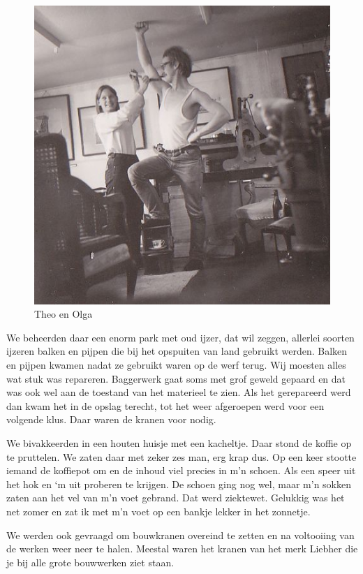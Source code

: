 \documentclass[12pt,twoside, openright]{memoir}
\begin{document}
\begin{figure}
\centering
\includegraphics[width=\textwidth]{img/223TheoenOlga.jpg}
\caption*{\footnotesize Theo en Olga}
\end{figure} 

We beheerden daar een enorm park met oud ijzer, dat wil zeggen, allerlei soorten ijzeren balken en pijpen die bij het opspuiten van land gebruikt werden. Balken en pijpen kwamen nadat ze gebruikt waren op de werf terug. Wij moesten alles wat stuk was repareren. Baggerwerk gaat soms met grof geweld gepaard en dat was ook wel aan de toestand van het materieel te zien. Als het gerepareerd werd dan kwam het in de opslag terecht, tot het weer afgeroepen werd voor een volgende klus. Daar waren de kranen voor nodig. 

We bivakkeerden in een houten huisje met een kacheltje. Daar stond de koffie op te pruttelen. We zaten daar met zeker zes man, erg krap dus. Op een keer stootte iemand de koffiepot om en de inhoud viel precies in m'n schoen. Als een speer uit het hok en `m uit proberen te krijgen. De schoen ging nog wel, maar m'n sokken zaten aan het vel van m'n voet gebrand. Dat werd ziektewet. Gelukkig was het net zomer en zat ik met m'n voet op een bankje lekker in het zonnetje.

We werden ook gevraagd om bouwkranen overeind te zetten en na voltooiing van de werken weer neer te halen. Meestal waren het kranen van het merk Liebher die je bij alle grote bouwwerken ziet staan. 
\end{document}
